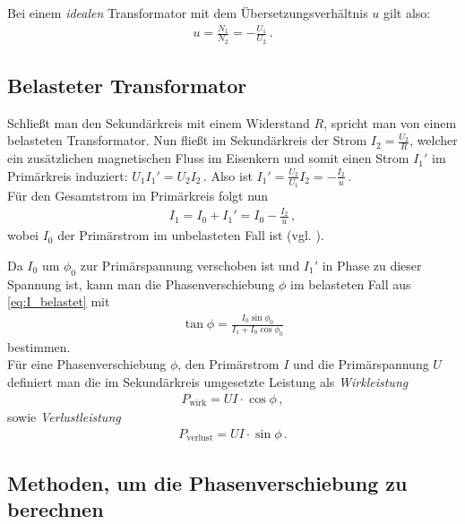 \documentclass[12pt,a4paper,titlepage,headinclude,bibtotoc]{scrartcl}
\begin{document}
Bei einem \textit{idealen} Transformator mit dem Übersetzungsverhältnis $u$ gilt also:
\begin{align}
	u=\frac{N_1}{N_2}=-\frac{U_1}{U_2}\,.
	\label{eq:u}  
\end{align}

\subsection{Belasteter Transformator}
Schließt man den Sekundärkreis mit einem Widerstand $R$, spricht man von einem belasteten Transformator.
Nun fließt im Sekundärkreis der Strom $I_2=\frac{U_2}{R}$, welcher ein zusätzlichen magnetischen Fluss im Eisenkern und somit einen Strom $I_1'$ im Primärkreis induziert: $U_1I_1'=U_2I_2\,$.
Also ist $I_1'=\frac{U_2}{U_1}I_2=-\frac{I_2}{u}\,.$\\
Für den Gesamtstrom im Primärkreis folgt nun
\begin{align}
	I_1=I_0+I_1'=I_0-\frac{I_2}{u}\,,
	\label{eq:I_belastet}
\end{align}
wobei $I_0$ der Primärstrom im unbelasteten Fall ist (vgl. \cite[S.433]{gerthsen}).

Da $I_0$ um $\phi_0$ zur Primärspannung verschoben ist und $I_1'$ in Phase zu dieser Spannung ist, kann man die Phasenverschiebung $\phi$ im belasteten Fall aus \eqref{eq:I_belastet} mit 
\begin{align}
	\tan\phi=\frac{I_0 \sin\phi_0}{I_1+I_0\cos\phi_0}
	\label{eq:phase_theo}
\end{align}
bestimmen.\\


Für eine Phasenverschiebung $\phi$, den Primärstrom $I$ und die Primärspannung $U$ definiert man die im Sekundärkreis umgesetzte Leistung als \textit{Wirkleistung}
\begin{align}
	P_\text{wirk}=UI\cdot\cos\phi\,,
	\label{eq:wirk}
\end{align}
sowie \textit{Verlustleistung}
\begin{align}
	P_\text{verlust}=UI\cdot\sin\phi\,.
	\label{eq:verlust}
\end{align}

\subsection{Methoden, um die Phasenverschiebung zu berechnen}
\end{document}
